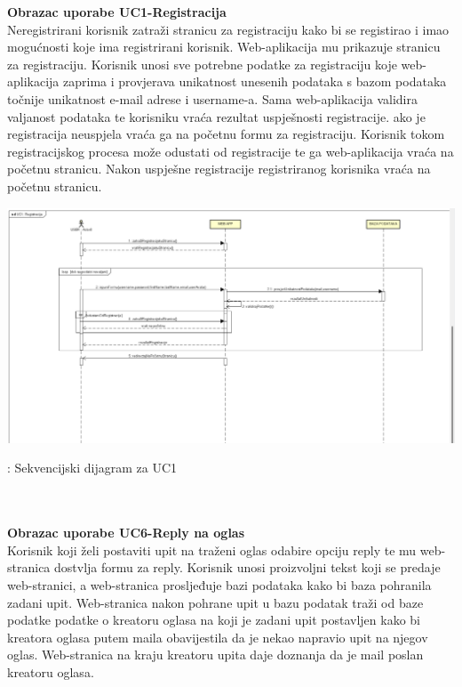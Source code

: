 				
				\noindent\textbf{Obrazac uporabe UC1-Registracija}\\
				Neregistrirani korisnik zatraži stranicu za registraciju kako bi se registirao i imao mogućnosti koje ima registrirani korisnik. Web-aplikacija mu prikazuje stranicu za registraciju. Korisnik unosi sve potrebne podatke za registraciju koje web-aplikacija zaprima i provjerava unikatnost unesenih podataka s bazom podataka točnije unikatnost e-mail adrese i username-a. Sama web-aplikacija validira valjanost podataka te korisniku vraća rezultat uspješnosti registracije. ako je registracija neuspjela vraća ga na početnu formu za registraciju. Korisnik tokom registracijskog procesa može odustati od registracije te ga web-aplikacija vraća na početnu stranicu. Nakon uspješne registracije registriranog korisnika vraća na početnu stranicu. 
				\\
                \begin{fig}
				    \graphicspath{ {slike/} }
  
                    \centering
                    \includegraphics[width=\textwidth]{UC1_ Registracija_sekvencijskiDijagram.png}
                    \caption{: Sekvencijski dijagram za UC1}
                \end{fig}
				\\
				\\
			    \noindent\textbf{Obrazac uporabe UC6-Reply na oglas}\\
			    Korisnik koji želi postaviti upit na traženi oglas odabire opciju reply te mu web-stranica dostvlja formu za reply. Korisnik unosi proizvoljni tekst koji se predaje web-stranici, a web-stranica prosljeđuje bazi podataka kako bi baza pohranila zadani upit. Web-stranica nakon pohrane upit u bazu podatak traži od baze podatke podatke o kreatoru oglasa na koji je zadani upit postavljen kako bi kreatora oglasa putem maila obavijestila da je nekao napravio upit na njegov oglas. Web-stranica na kraju kreatoru upita daje doznanja da je mail poslan kreatoru oglasa.
